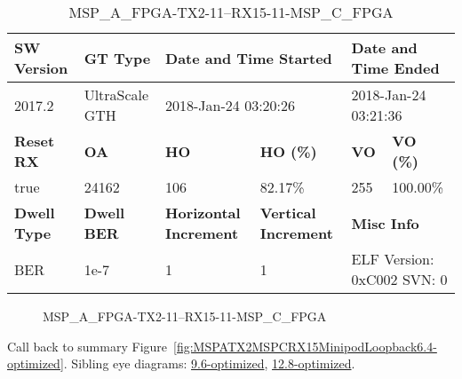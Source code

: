 \begin{table}[h]
\centering
\caption{MSP\_A\_FPGA-TX2-11--RX15-11-MSP\_C\_FPGA}
\label{tab:MSPAFPGATX211RX1511MSPCFPGA6.4-optimized}
\begin{tabular}{@{}|l|l|l|l|l|l|@{}}
\toprule
\textbf{SW Version}                & \textbf{GT Type}   & \multicolumn{2}{l|}{\textbf{Date and Time Started}}            & \multicolumn{2}{l|}{\textbf{Date and Time Ended}}        \\ \midrule
2017.2                       & UltraScale GTH          & \multicolumn{2}{l|}{2018-Jan-24 03:20:26}                   & \multicolumn{2}{l|}{2018-Jan-24 03:21:36}               \\ \midrule
\textbf{Reset RX}                  & \textbf{OA} & \textbf{HO}   & \textbf{HO (\%)} & \textbf{VO} & \textbf{VO (\%)} \\ \midrule
true & 24162        & 106          & 82.17\%        & 255        & 100.00\%       \\ \midrule
\textbf{Dwell Type}                & \textbf{Dwell BER} & \textbf{Horizontal Increment} & \textbf{Vertical Increment}    & \multicolumn{2}{l|}{\textbf{Misc Info}}                  \\ \midrule
BER                            & 1e-7        & 1        & 1           & \multicolumn{2}{l|}{ELF Version: 0xC002 SVN: 0}                         \\ \bottomrule
\end{tabular}
\end{table}

\begin{figure}[h]
\caption{MSP\_A\_FPGA-TX2-11--RX15-11-MSP\_C\_FPGA} \label{fig:MSPAFPGATX211RX1511MSPCFPGA6.4-optimized}
\end{figure}

Call back to summary Figure~\ref{fig:MSPATX2MSPCRX15MinipodLoopback6.4-optimized}.
Sibling eye diagrams: \hyperref[sec:MSPAFPGATX211RX1511MSPCFPGA9.6-optimized]{9.6-optimized}, \hyperref[sec:MSPAFPGATX211RX1511MSPCFPGA12.8-optimized]{12.8-optimized}.

\clearpage
\newpage

